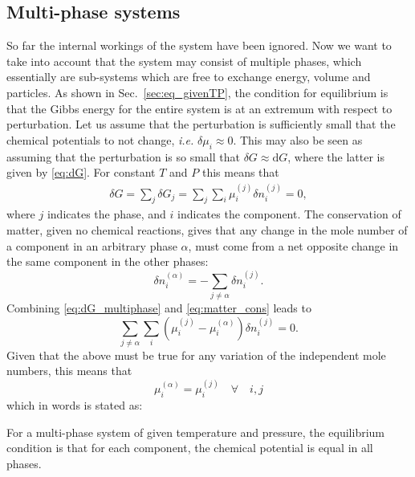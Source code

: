 \documentclass[internal,english]{sintefmemo2012}
\newcommand{\dd}[1]{\mathrm{d}{#1}}
\begin{document}
\subsection{Multi-phase systems}
\label{sec:eq_multiphase}
So far the internal workings of the system have been ignored. Now we want to take into account that the system may consist of multiple phases, 
which essentially are sub-systems which are free to exchange energy, volume and particles.
As shown in Sec.~\ref{sec:eq_givenTP}, the condition for equilibrium is that the Gibbs energy for the entire system is at an extremum with respect to perturbation. 
Let us assume that the perturbation is sufficiently small that the chemical potentials to not change, \textit{i.e.} $\delta \mu_i \approx 0$. This may also be seen as 
assuming that the perturbation is so small that $\delta G \approx \dd{G}$, where the latter is given by \eqref{eq:dG}.
For constant $T$ and $P$ this means that 
\begin{align}
  \delta G = \sum_j \delta G_j = \sum_j \sum_i \mu_i^{(j)} \delta n_i^{(j)} = 0,
  \label{eq:dG_multiphase}
\end{align}
where $j$ indicates the phase, and $i$ indicates the component. The conservation of matter, given no chemical reactions, 
gives that any change in the mole number of a component in an arbitrary phase $\alpha$, must come from a net opposite change in the same 
component in the other phases:
\begin{equation}
  \delta n_i^{(\alpha)}  = - \sum_{j\neq \alpha} \delta n_i^{(j)}.
  \label{eq:matter_cons}
\end{equation}
Combining \eqref{eq:dG_multiphase} and \eqref{eq:matter_cons} leads to 
\begin{equation}
  \sum_{j\neq \alpha} \sum_i \left( \mu_i^{(j)} - \mu_i^{(\alpha)} \right) \delta n_i^{(j)} = 0.
  \label{}
\end{equation}
Given that the above must be true for any variation of the independent mole numbers, this means that 
\begin{equation}
  \mu_i^{(\alpha)} = \mu_i^{(j)} \quad \forall \quad  i,j
  \label{}
\end{equation}
which in words is stated as:
\begin{framed}
  \noindent
  For a multi-phase system of given temperature and pressure, the equilibrium condition is that for each component, the chemical potential 
  is equal in all phases.
\end{framed}
\end{document}
